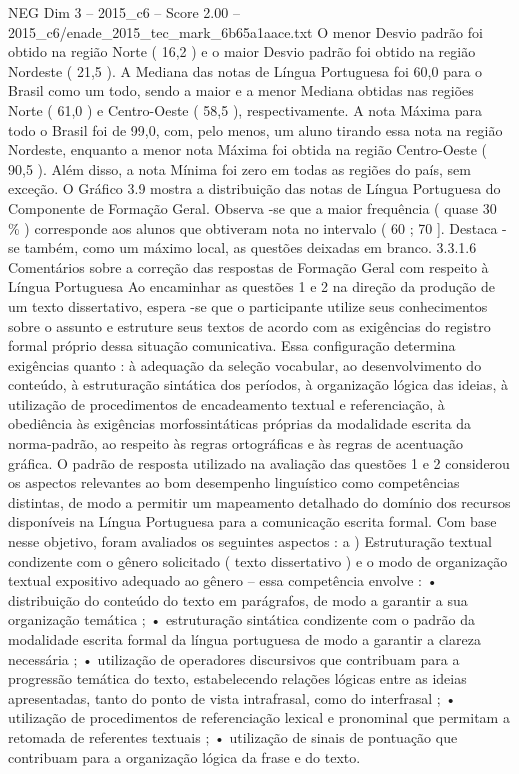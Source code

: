 \begin{textsample}{NEG Dim 3 – 2015\_c6 – Score 2.00 – 2015\_c6/enade\_2015\_tec\_mark\_6b65a1aace.txt}
O menor Desvio padrão foi obtido na região Norte ( 16,2 ) e o maior Desvio padrão foi obtido na região Nordeste ( 21,5 ).
A Mediana das notas de Língua Portuguesa foi 60,0 para o Brasil como um todo, sendo a maior e a menor Mediana obtidas nas regiões Norte ( 61,0 ) e Centro-Oeste ( 58,5 ), respectivamente.
A nota Máxima para todo o Brasil foi de 99,0, com, pelo menos, um aluno tirando essa nota na região Nordeste, enquanto a menor nota Máxima foi obtida na região Centro-Oeste ( 90,5 ).
Além disso, a nota Mínima foi zero em todas as regiões do país, sem exceção.
O Gráfico 3.9 mostra a distribuição das notas de Língua Portuguesa do Componente de Formação Geral.
Observa -se que a maior frequência ( quase 30 \% ) corresponde aos alunos que obtiveram nota no intervalo ( 60 ; 70 ].
Destaca -se também, como um máximo local, as questões deixadas em branco. 3.3.1.6 Comentários sobre a correção das respostas de Formação Geral com respeito à Língua Portuguesa Ao encaminhar as questões 1 e 2 na direção da produção de um texto dissertativo, espera -se que o participante utilize seus conhecimentos sobre o assunto e estruture seus textos de acordo com as exigências do registro formal próprio dessa situação comunicativa.
Essa configuração determina exigências quanto : à adequação da seleção vocabular, ao desenvolvimento do conteúdo, à estruturação sintática dos períodos, à organização lógica das ideias, à utilização de procedimentos de encadeamento textual e referenciação, à obediência às exigências morfossintáticas próprias da modalidade escrita da norma-padrão, ao respeito às regras ortográficas e às regras de acentuação gráfica.
O padrão de resposta utilizado na avaliação das questões 1 e 2 considerou os aspectos relevantes ao bom desempenho linguístico como competências distintas, de modo a permitir um mapeamento detalhado do domínio dos recursos disponíveis na Língua Portuguesa para a comunicação escrita formal.
Com base nesse objetivo, foram avaliados os seguintes aspectos : a ) Estruturação textual condizente com o gênero solicitado ( texto dissertativo ) e o modo de organização textual expositivo adequado ao gênero – essa competência envolve : • distribuição do conteúdo do texto em parágrafos, de modo a garantir a sua organização temática ; • estruturação sintática condizente com o padrão da modalidade escrita formal da língua portuguesa de modo a garantir a clareza necessária ; • utilização de operadores discursivos que contribuam para a progressão temática do texto, estabelecendo relações lógicas entre as ideias apresentadas, tanto do ponto de vista intrafrasal, como do interfrasal ; • utilização de procedimentos de referenciação lexical e pronominal que permitam a retomada de referentes textuais ; • utilização de sinais de pontuação que contribuam para a organização lógica da frase e do texto.

\end{textsample}
